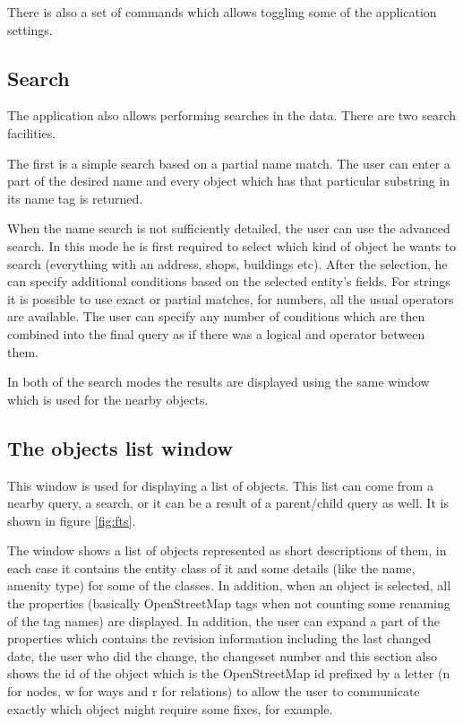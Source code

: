 \documentclass[nolof,digital]{fithesis3}
\begin{document}
There is also a set of commands which allows toggling some of the application settings.
\subsection{Search}
The application also allows performing searches in the data. There are two search facilities.

The first is a simple search based on a partial name match. The user can enter a part of the desired name and every object which has that particular substring in its name tag is returned.

When the name search is not sufficiently detailed, the user can use the advanced search. In this mode he is first required to select which kind of object he wants to search (everything with an address, shops, buildings etc). After the selection, he can specify additional conditions based on the selected entity's fields. For strings it is possible to use exact or partial matches, for numbers, all the usual operators are available. The user can specify any number of conditions which are then combined into the final query as if there was a logical and operator between them.

In both of the search modes the results are displayed using the same window which is used for the nearby objects.
\subsection{The objects list window}
This window is used for displaying a list of objects. This list can come from a nearby query, a search, or it can be a result of a parent/child query as well. It is shown in figure \ref{fig:fts}.

The window shows a list of objects represented as short descriptions of them, in each case it contains the entity class of it and some details (like the name, amenity type) for some of the classes. In addition, when an object is selected, all the properties (basically OpenStreetMap tags when not counting some renaming of the tag names) are displayed. In addition, the user can expand a part of the properties which contains the revision information including the last changed date, the user who did the change, the changeset number and this section also shows the id of the object which is the OpenStreetMap id prefixed by a letter (n for nodes, w for ways and r for relations) to allow the user to communicate exactly which object might require some fixes, for example.
\end{document}
